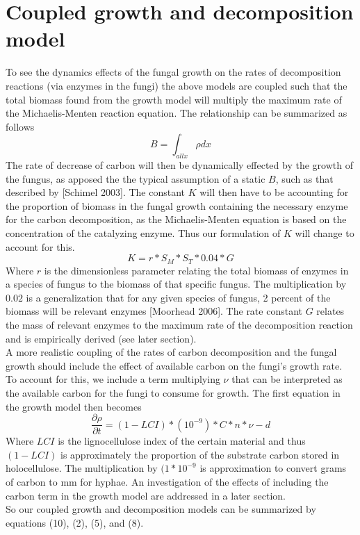 \documentclass[10pt]{article}
\begin{document}
\section*{Coupled growth and decomposition model}
To see the dynamics effects of the fungal growth on the rates of decomposition reactions (via enzymes in the fungi) the above models are coupled such that the total biomass found from the growth model will multiply the maximum rate of the Michaelis-Menten reaction equation. The  relationship can be summarized as follows
\begin{equation} \label {eq}
    B = \int_{all x}\rho dx
\end{equation}
The rate of decrease of carbon will then be dynamically effected by the growth of the fungus, as apposed the the typical assumption of a static $B$, such as that described by [Schimel 2003]. The constant $K$ will then have to be accounting for the proportion of biomass in the fungal growth containing the necessary enzyme for the carbon decomposition, as the Michaelis-Menten equation is based on the concentration of the catalyzing enzyme. Thus our formulation of $K$ will change to account for this. 
\begin{equation} \label {eq}
    K = r*S_{M}*S_{T}*0.04*G
\end{equation}
Where $r$ is the dimensionless parameter relating the total biomass of enzymes in a species of fungus to the biomass of that specific fungus. The multiplication by $0.02$ is a generalization that for any given species of fungus, 2 percent of the biomass will be relevant enzymes [Moorhead 2006]. The rate constant $G$ relates the mass of relevant enzymes to the maximum rate of the decomposition reaction and is empirically derived (see later section). \\
A more realistic coupling of the rates of carbon decomposition and the fungal growth should include the effect of available carbon on the fungi's growth rate. To account for this, we include a term multiplying $\nu$ that can be interpreted as the available carbon for the fungi to consume for growth. The first equation in the growth model then becomes
\begin{equation} \label{eq}
    \frac{\partial \rho}{\partial t} = (1-LCI)*(10^{-9})*C*n*\nu - d
\end{equation}
Where $LCI$ is the lignocellulose index of the certain material and thus $(1-LCI)$ is approximately the proportion of the substrate carbon stored in holocellulose. The multiplication by $(1*10^{-9}$ is approximation to convert grams of carbon to mm for hyphae. An investigation of the effects of including the carbon term in the growth model are addressed in a later section. \\
So our coupled growth and decomposition models can be summarized by equations (10), (2), (5), and (8).
\end{document}
